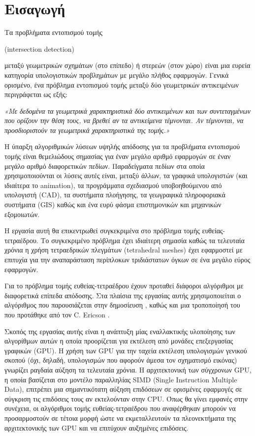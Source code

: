 \mainmatter
\chapter{Εισαγωγή}

\noindent Τα προβλήματα εντοπισμού τομής \begin{english}(intersection detection)\end{english} μεταξύ γεωμετρικών σχημάτων (στο επίπεδο) ή στερεών (στον χώρο) είναι μια ευρεία κατηγορία υπολογιστικών προβλημάτων με μεγάλο πλήθος εφαρμογών. Γενικά ορισμένο, ένα πρόβλημα εντοπισμού τομής μεταξύ δύο γεωμετρικών αντικειμένων περιγράφεται ως εξής:

\emph{«Με δεδομένα τα γεωμετρικά χαρακτηριστικά δύο αντικειμένων και των συντεταγμένων που ορίζουν την θέση τους, να βρεθεί
αν τα αντικείμενα τέμνονται. Αν τέμνονται, να προσδιοριστούν τα γεωμετρικά χαρακτηριστικά της τομής.»}

Η ύπαρξη αλγοριθμικών λύσεων υψηλής απόδοσης για τα προβλήματα εντοπισμού τομής είναι θεμελιώδους σημασίας για έναν μεγάλο αριθμό εφαρμογών 
σε έναν μεγάλο αριθμό διαφορετικών πεδίων. Παραδείγματα πεδίων στα οποία χρησιμοποιούνται οι λύσεις αυτές είναι, μεταξύ άλλων, τα γραφικά υπολογιστών (και ιδιαίτερα το animation), τα προγράμματα σχεδιασμού υποβοηθούμενου από υπολογιστή (CAD), τα συστήματα πλοήγησης, τα γεωγραφικά πληροφοριακά συστήματα (GIS) καθώς και ένα ευρύ φάσμα επιστημονικών
και μηχανικών εξομοιωτών.

Η εργασία αυτή θα επικεντρωθεί συγκεκριμένα στο πρόβλημα τομής ευθείας-τετραέδρου. Το συγκεκριμένο  πρόβλημα έχει ιδιαίτερη σημασία καθώς τα τελευταία χρόνια η χρήση τετραεδρικών πλεγμάτων (tetrahedral meshes) έχει εφαρμοστεί με επιτυχία για την αναπαράσταση περίπλοκων τριδιάστατων όγκων σε ένα μεγάλο εύρος εφαρμογών.      

Για το πρόβλημα τομής ευθείας-τετραέδρου έχουν προταθεί διάφοροι αλγόριθμοι με διαφορετικά επίπεδα απόδοσης. Στα πλαίσια της εργασίας αυτής χρησιμοποιείται ο αλγόριθμος που παρουσιάζεται στην δημοσίευση \cite{PlatisTheoharis03}, καθώς και μια τροποποίησή του που προτάθηκε από τον C. Ericson \cite{ericson2005real}\cite{ericson2007blog}.

Σκοπός της εργασίας αυτής είναι η ανάπτυξη μίας εναλλακτικής υλοποίησης των αλγορίθμων αυτών η οποία προορίζεται για εκτέλεση από μονάδες επεξεργασίας γραφικών (GPU). Η χρήση των GPU για την ταχεία εκτέλεση υπολογισμών γενικού σκοπού (όχι, δηλαδή, υπολογισμών που αφορούν άμεσα τον σχηματισμό εικόνας) γνωρίζει ραγδαία αύξηση τα τελευταία χρόνια. Η αρχιτεκτονική των σύγχρονων GPU, η οποία βασίζεται στο μοντέλο παραλληλίας SIMD (Single Instruction Multiple Data), επιτρέπει μια σημαντικότατη αύξηση επιδόσεων σε ορισμένες εφαρμογές σε σύγκριση τις επιδόσεις τους αν εκτελούνταν στην CPU. Όπως θα γίνει εμφανές στην συνέχεια, οι αλγόριθμοι τομής ευθείας-τετραέδρου που αναφέρθηκαν μπορούν να προσαρμοστούν σε τέτοια μορφή ώστε να εκμεταλλευτούν τα πλεονεκτήματα της αρχιτεκτονικής των GPU και να επιτύχουν αυξημένες επιδόσεις.   

